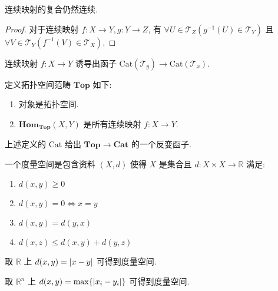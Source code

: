 \begin{lemma}
    连续映射的复合仍然连续.

    \begin{proof}
        对于连续映射 \(f : X \to Y, g : Y \to Z\), 有 \(\forall U \in \mathcal{T}_Z (g^{-1} (U) \in \mathcal{T}_Y)\) 且 \(\forall V \in \mathcal{T}_Y (f^{-1} (V) \in \mathcal{T}_X)\),
    \end{proof}
\end{lemma}

\begin{corollary}
    连续映射 \(f : X \to Y\) 诱导出函子 \(\mathrm{Cat} (\mathcal{T}_y) \to \mathrm{Cat} (\mathcal{T}_x)\).
\end{corollary}

\begin{definition}
    定义拓扑空间范畴 \(\mathbf{Top}\) 如下:
    \begin{enumerate}
        \item 对象是拓扑空间.
        \item \(\mathbf{Hom}_{\mathbf{Top}} (X,Y)\) 是所有连续映射 \(f : X \to Y\).
    \end{enumerate}
\end{definition}

\begin{corollary}
    上述定义的 \(\mathrm{Cat}\) 给出 \(\mathbf{Top} \to \mathbf{Cat}\) 的一个反变函子.
\end{corollary}

\begin{definition}
    一个度量空间是包含资料 \((X,d)\) 使得 \(X\) 是集合且 \(d : X \times X \to \mathbb{R}\) 满足:
    \begin{enumerate}
        \item \(d(x,y) \geq 0\)
        \item \(d(x,y) = 0 \iff x = y\)
        \item \(d(x,y) = d(y,x)\)
        \item \(d(x,z) \leq d(x,y) + d(y,z)\)
    \end{enumerate}
\end{definition}

\begin{example}
    取 \(\mathbb{R}\) 上 \(d(x,y) = \abs{x - y}\) 可得到度量空间.
\end{example}

\begin{example}
    取 \(\mathbb{R}^n\) 上 \(d(x,y) = \max \{\abs{x_i - y_i}\}\) 可得到度量空间.
\end{example}

